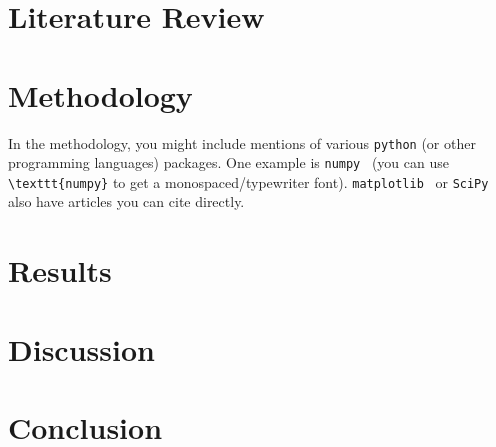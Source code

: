\documentclass[masters,en,listoffigures,listoftables]{NMBU}
\begin{document}
\clearpage
\section{Literature Review}

\clearpage
\section{Methodology}

In the methodology, you might include mentions of various \texttt{python} (or other programming languages) packages. One example is \texttt{numpy}~\cite{NumPy}  (you can use \verb|\texttt{numpy}| to get a monospaced/typewriter font). \texttt{matplotlib}~\cite{Matplotlib} or \texttt{SciPy}~\cite{SciPy} also have articles you can cite directly.

\clearpage
\section{Results}

\clearpage
\section{Discussion}

\clearpage
\section{Conclusion}

\clearpage
{} %

\clearpage
\appendices %
\end{document}
